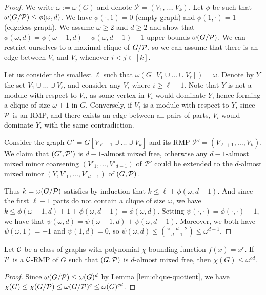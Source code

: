 \documentclass[11pt]{article}
\numberwithin{equation}{section}
\begin{document}
\begin{proof}
We write $\omega:=\omega(G)$ and denote $\mathcal{P} = (V_1, \ldots, V_k)$. Let $\phi$ be such that $\omega(G/{\cal P}) \leq \phi(\omega, d)$. We have $\phi(\cdot, 1)=0$ (empty graph) and $\phi(1, \cdot) = 1$ (edgeless graph). We assume $\omega\geq 2$ and $d\geq 2$ and show that $\phi(\omega, d)= \phi(\omega-1, d)+\phi(\omega, d-1)+1$ upper bounds $\omega(G/{\cal P})$. We can restrict ourselves to a maximal clique of $G/{\cal P}$, so we can assume that there is an edge between $V_i$ and $V_j$ whenever $i < j \in [k]$.    

Let us consider the smallest $\ell$ such that $\omega(G[V_1\cup \dots \cup V_{\ell}])=\omega$. Denote by $Y$ the set $V_1\cup \dots \cup V_{\ell}$, and consider any $V_i$ where $i\geq \ell +1$. Note that $Y$ is not a module with respect to $V_i$, as some vertex in $V_i$ would dominate $Y$, hence forming a clique of size $\omega +1$ in $G$. Conversely, if $V_i$ is a module with respect to $Y$, since $\cal P$ is an RMP, and there exists an edge between all pairs of parts, $V_i$ would dominate $Y$, with the same contradiction.

Consider the graph $G'=G[V_{\ell+1}\cup \dots \cup V_{k}]$ and its RMP $\mathcal{P'} = (V_{\ell +1}, \ldots, V_k)$. We claim that $(G',\cal P')$ is $d-1$-almost mixed free, otherwise any $d-1$-almost mixed minor coarsening $(V'_1, \ldots, V'_{d-1})$ of $\mathcal{P'}$ could be extended to the $d$-almost mixed minor $(Y,V'_1, \ldots, V'_{d-1})$ of $(G,\cal P)$. 

Thus $k=\omega (G/\cal P)$ satisfies by induction that $k\leq \ell + \phi(\omega, d-1)$. And since the first $\ell -1$ parts do not contain a clique of size $\omega$, we have $k \leq \phi(\omega - 1, d) + 1 + \phi(\omega, d-1)= \phi(\omega, d)$. Setting  $\psi(\cdot,\cdot)=\phi(\cdot,\cdot)-1$, we have that $\psi (\omega,d)=\psi(\omega - 1, d) + \psi(\omega, d-1)$. Moreover, we both have $\psi (\omega,1)=-1$ and $\psi (1,d)=0$, so $\psi (\omega,d)\leq \binom{\omega + d - 2}{d-1}\leq \omega ^{d-1}$.
\end{proof}


\begin{proposition} \label{prop:RMPpcb} Let $\cal C$ be a class of graphs with polynomial $\chi$-bounding function $f(x)=x^c$. If $\cal P$ is a $\cal C$-RMP of $G$ such that $(G,\cal P)$ is $d$-almost mixed free, then $\chi (G)\leq \omega ^{cd}$.
\end{proposition}

\begin{proof}
   Since $\omega(G/{\cal P}) \leq \omega(G)^{d}$ by Lemma \ref{lem:clique-quotient}, we have $\chi(G)\leq \chi(G/{\cal P})\leq \omega(G/{\cal P})^c\leq \omega(G)^{cd}$.
\end{proof} 
\end{document}
